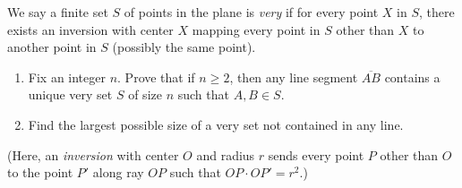 We say a finite set $S$ of points in the plane is \emph{very} if for every point $X$ in $S$, there exists an inversion with center $X$ mapping every point in $S$ other than $X$ to another point in $S$ (possibly the same point).
\begin{enumerate}[label=(\alph*)]
	\item Fix an integer $n$. Prove that if $n \ge 2$, then any line segment $\overline{AB}$ contains a unique very set $S$ of size $n$ such that $A, B \in S$.
	\item Find the largest possible size of a very set not contained in any line.
\end{enumerate}
(Here, an \emph{inversion} with center $O$ and radius $r$ sends every point $P$ other than $O$ to the point $P'$ along ray $OP$ such that $OP\cdot OP' = r^2$.)